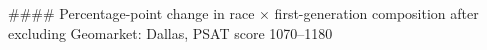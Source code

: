#### Percentage-point change in race × first-generation composition after excluding Geomarket: Dallas, PSAT score 1070–1180
